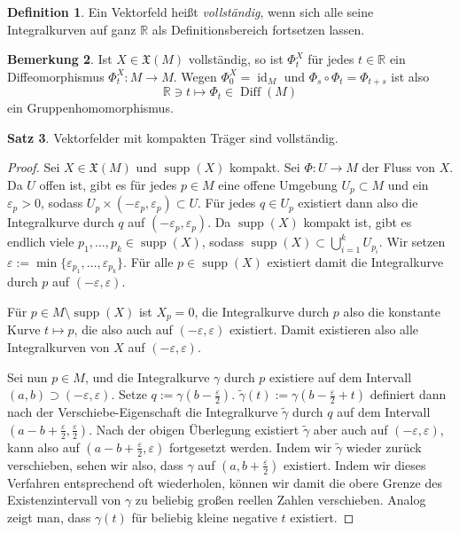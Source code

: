 \documentclass[a4paper]{scrreprt}
\numberwithin{equation}{chapter}
\DeclareMathOperator{\id}{id}
\DeclareMathOperator{\Diff}{Diff}
\DeclareMathOperator{\supp}{supp}
\newcommand{\R}{\mathbb{R}}
\theoremstyle{definition}
\newtheorem{defn}{Definition}[section]
\newtheorem{satz}[defn]{Satz}
\newtheorem{bem}[defn]{Bemerkung}
\begin{document}
\begin{defn}
	Ein Vektorfeld heißt \emph{vollständig}, wenn sich alle seine Integralkurven auf ganz $\R$ als Definitionsbereich fortsetzen lassen.
\end{defn}
\begin{bem}
	Ist $X\in\mathfrak X(M)$ vollständig, so ist $\Phi^X_t$ für jedes $t\in\R$ ein Diffeomorphismus $\Phi^X_t\colon M\to M$. Wegen $\Phi^X_0 = \id_M$ und $\Phi_s\circ\Phi_t = \Phi_{t+s}$ ist also
	\[\R \ni t \mapsto \Phi_t \in \Diff(M)\]
	ein Gruppenhomomorphismus.
\end{bem}
\begin{satz}
	Vektorfelder mit kompakten Träger sind vollständig.
	
	\begin{proof}
		Sei $X \in \mathfrak X(M)$ und $\supp(X)$ kompakt. Sei $\Phi\colon U\to M$ der Fluss von $X$. Da $U$ offen ist, gibt es für jedes $p\in M$ eine offene Umgebung $U_p \subset M$ und ein $\varepsilon_p > 0$, sodass $U_p \times (-\varepsilon_p, \varepsilon_p) \subset U$. Für jedes $q \in U_p$ existiert dann also die Integralkurve durch $q$ auf $(-\varepsilon_p,\varepsilon_p)$. Da $\supp(X)$ kompakt ist, gibt es endlich viele $p_1,\dots,p_k \in \supp(X)$, sodass $\supp(X) \subset \bigcup_{i=1}^k U_{p_i}$. Wir setzen $\varepsilon := \min\{\varepsilon_{p_1}, \dots, \varepsilon_{p_k}\}$. Für alle $p \in \supp(X)$ existiert damit die Integralkurve durch $p$ auf $(-\varepsilon, \varepsilon)$.

		Für $p \in M \setminus \supp(X)$ ist $X_p = 0$, die Integralkurve durch $p$ also die konstante Kurve $t \mapsto p$, die also auch auf $(-\varepsilon, \varepsilon)$ existiert. Damit existieren also alle Integralkurven von $X$ auf $(-\varepsilon, \varepsilon)$.

		Sei nun $p\in M$, und die Integralkurve $\gamma$ durch $p$ existiere auf dem Intervall $(a,b) \supset (-\varepsilon,\varepsilon)$. Setze $q := \gamma(b - \frac{\varepsilon}{2})$. $\tilde\gamma(t) := \gamma(b - \frac{\varepsilon}{2} + t)$ definiert dann nach der Verschiebe-Eigenschaft die Integralkurve $\tilde\gamma$ durch $q$ auf dem Intervall $(a - b + \frac{\varepsilon}{2}, \frac{\varepsilon}{2})$. Nach der obigen Überlegung existiert $\tilde\gamma$ aber auch auf $(-\varepsilon, \varepsilon)$, kann also auf $(a - b + \frac{\varepsilon}{2}, \varepsilon)$ fortgesetzt werden. Indem wir $\tilde\gamma$ wieder zurück verschieben, sehen wir also, dass $\gamma$ auf $(a,b+\frac{\varepsilon}{2})$ existiert. Indem wir dieses Verfahren entsprechend oft wiederholen, können wir damit die obere Grenze des Existenzintervall von $\gamma$ zu beliebig großen reellen Zahlen verschieben. Analog zeigt man, dass $\gamma(t)$ für beliebig kleine negative $t$ existiert.
	\end{proof}
\end{satz}
\end{document}
